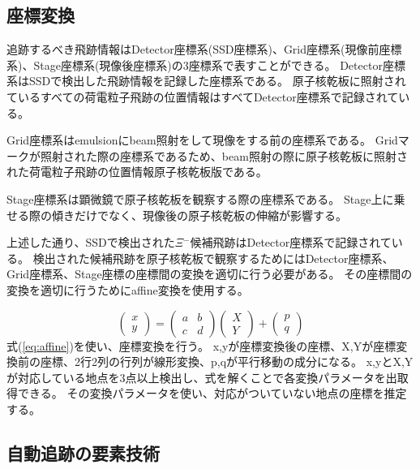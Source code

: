 \documentclass[12pt,a4paper]{jarticle}
\begin{document}
\subsection{座標変換}
追跡するべき飛跡情報はDetector座標系(SSD座標系)、Grid座標系(現像前座標系)、Stage座標系(現像後座標系)の3座標系で表すことができる。
Detector座標系はSSDで検出した飛跡情報を記録した座標系である。
原子核乾板に照射されているすべての荷電粒子飛跡の位置情報はすべてDetector座標系で記録されている。
\par
Grid座標系はemulsionにbeam照射をして現像をする前の座標系である。
Gridマークが照射された際の座標系であるため、beam照射の際に原子核乾板に照射された荷電粒子飛跡の位置情報原子核乾板版である。
\par
Stage座標系は顕微鏡で原子核乾板を観察する際の座標系である。
Stage上に乗せる際の傾きだけでなく、現像後の原子核乾板の伸縮が影響する。
\par
上述した通り、SSDで検出された$\Xi$$^-$候補飛跡はDetector座標系で記録されている。
検出された候補飛跡を原子核乾板で観察するためにはDetector座標系、Grid座標系、Stage座標の座標間の変換を適切に行う必要がある。
その座標間の変換を適切に行うためにaffine変換を使用する。
\par
\begin{equation}
  \left(
    \begin{array}{c}
    x \\
    y
    \end{array}
  \right)
  =
  \left(
    \begin{array}{cc}
      a & b \\
      c & d
    \end{array}
  \right)
  \left(
    \begin{array}{c}
      X \\
      Y
    \end{array}
  \right)
  +
  \left(
    \begin{array}{c}
      p \\
      q
    \end{array}
  \right)
\label{eq:affine}
\end{equation}
式(\ref{eq:affine})を使い、座標変換を行う。
x,yが座標変換後の座標、X,Yが座標変換前の座標、2行2列の行列が線形変換、p,qが平行移動の成分になる。
x,yとX,Yが対応している地点を3点以上検出し、式を解くことで各変換パラメータを出取得できる。
その変換パラメータを使い、対応がついていない地点の座標を推定する。
\subsection{自動追跡の要素技術}
\end{document}

